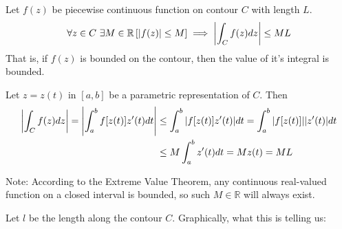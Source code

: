 \documentclass[12pt, english]{book}
\makeatletter
\renewenvironment{proof}[1][\proofname]{\par
	\pushQED{\qed}%
	\normalfont \topsep6\p@\@plus6\p@\relax
	\list{}{%
		\settowidth{\leftmargin}{\itshape\proofname:\hskip\labelsep}%
		\setlength{\labelwidth}{0pt}%
		\setlength{\itemindent}{-\leftmargin}%
	}%
	\item[\hskip\labelsep\itshape#1\@addpunct{:}]\ignorespaces
}{%
	\popQED\endlist\@endpefalse
}
\makeatother
\begin{document}
	\begin{theorem}
		\label{Upper Bound for Moduli of Contour Integral Theorem - Complex}
		Let \(f(z)\) be piecewise continuous function on contour \(C\) with length \(L\).
		\begin{align*}
			\forall z \in C \ \exists M \in \mathbb{R} 
			\left[\abs{f(z)} \leq M \right] \implies \abs{\int_{C} f(z) dz} \leq ML 
		\end{align*}
		That is, if \(f(z)\) is bounded on the contour, then the value of it's integral is bounded. 
	\end{theorem}
	\begin{proof}
		Let \(z = z(t)\) in \([a, b]\) be a parametric representation of \(C\). Then
		\begin{align*}
			\abs{\int_{C} f(z) dz} = \abs{\int_{a}^{b} f[z(t)] z'(t) dt} 
			&\leq \int_{a}^{b} \abs{f[z(t)] z'(t)} dt = \int_{a}^{b}  \abs{f[z(t)]} \abs{z'(t)} dt  \\
			&\leq M \int_{a}^{b} z'(t) dt = M z(t) = ML
		\end{align*}
	\end{proof}

	Note: According to the Extreme Value Theorem, any continuous real-valued function on a closed interval is bounded, so such \(M \in \mathbb{R}\) will always exist. 
	
	\begin{observation}
		Let \(l\) be the length along the contour \(C\). Graphically, what this is telling us:
		\begin{figure}[H]
			\centering
		\end{figure}
	\end{observation}
\end{document}

